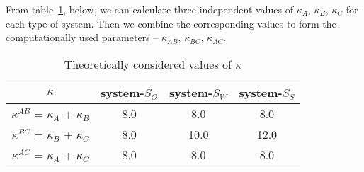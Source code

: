 \documentclass[12pt]{iiscthes}
\theoremstyle{definition}
\theoremstyle{definition}
\theoremstyle{remark}
\begin{document}
From table~\ref{ok}, below, we can calculate three independent values of $\kappa_A$, $\kappa_B$, $\kappa_C$ for each type of system. Then we combine the corresponding values to form the computationally used parameters -- $\kappa_{AB}$, $\kappa_{BC}$, $\kappa_{AC}$.  
\begin{table}[h]
\begin{center}
\begin{tabular}{|c|c|c|c|}
\hline
$\kappa$ & system-$S_O$ & system-$S_W$ & system-$S_S$\\
\hline
$\kappa^{AB}$ = $\kappa_A$ + $\kappa_B$ & 8.0 & 8.0 & 8.0 \\
\hline
$\kappa^{BC}$ = $\kappa_B$ + $\kappa_C$ & 8.0 & 10.0 & 12.0 \\
\hline
$\kappa^{AC}$ = $\kappa_A$ + $\kappa_C$ & 8.0 & 8.0 & 8.0\\
\hline
\end{tabular}\caption{Theoretically considered values of $\kappa$}\label{ok}
\end{center}
\end{table}
\newpage  
\end{document}
